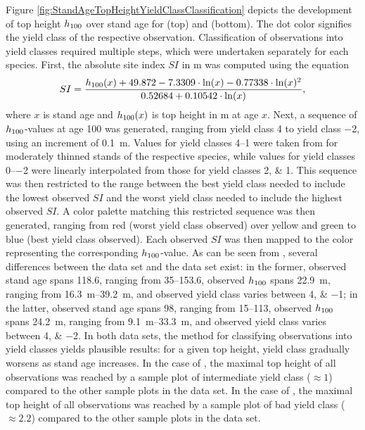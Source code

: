 Figure \ref{fig:StandAgeTopHeightYieldClassClassification} depicts the development of top height \(h_{100}\) over stand age for \Beech{} (top) and \Spruce{} (bottom).  The dot color signifies the yield class of the respective observation.  Classification of observations into yield classes required multiple steps, which were undertaken separately for each species.  First, the absolute site index \(SI\) in \si{\meter} was computed using the equation
\begin{equation}
  \label{eq:NagelFunctionSolvedForSI}
  SI = \frac{h_{100}(x) + 49.872 - 7.3309 \cdot \ln(x) - 0.77338 \cdot \ln(x)^2 }{0.52684 + 0.10542 \cdot \ln(x)} ,
\end{equation}
\parencite{Nagel1999} where \(x\) is stand age and \(h_{100}(x)\) is top height in \si{\meter} at age \(x\).  Next, a sequence of \(h_{100}{}\)-values at age \SI{100}{\year} was generated, ranging from yield class \num{4} to yield class \num{-2}, using an increment of \SI{0.1}{\meter}.  Values for yield classes \numrange{4}{1} were taken from \textcite{Schober1995} for moderately thinned stands of the respective species, while values for yield classes \numrange{0}{-2} were linearly interpolated from those for yield classes \numlist{2; 1}.   This sequence was then restricted to the range between the best yield class needed to include the lowest observed \(SI\) and the worst yield class needed to include the highest observed \(SI\).  A color palette matching this restricted sequence was then generated, ranging from red (worst yield class observed) over yellow and green to blue (best yield class observed).  Each observed \(SI\) was then mapped to the color representing the corresponding \(h_{100}{}\)-value.  As can be seen from , several differences between the \Beech{} data set and the \Spruce{} data set exist:  in the former, observed stand age spans \SI{118.6}{\year}, ranging from \SIrange{35}{153.6}{\year}, observed \(h_{100}{}\) spans \SI{22.9}{\meter}, ranging from \SIrange{16.3}{39.2}{\meter}, and observed yield class varies between \numlist{4; -1};  in the latter, observed stand age spans \SI{98}{\year}, ranging from \SIrange{15}{113}{\year}, observed \(h_{100}{}\) spans \SI{24.2}{\meter}, ranging from \SIrange{9.1}{33.3}{\meter}, and observed yield class varies between \numlist{4; -2}.  In both data sets, the method for classifying observations into yield classes yields plausible results:  for a given top height, yield class gradually worsens as stand age increases.   In the case of \Beech{}, the maximal top height of all observations was reached by a sample plot of intermediate yield class (\(\approx{} 1\)) compared to the other sample plots in the data set.   In the case of \Spruce{}, the maximal top height of all observations was reached by a sample plot of bad yield class (\(\approx{} 2.2\)) compared to the other sample plots in the data set.  


